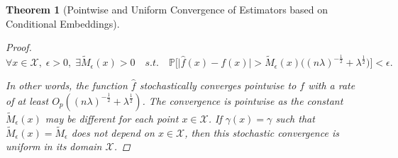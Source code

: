 \documentclass{article}
\newtheorem{theorem}{Theorem}[section]
\begin{document}
\begin{theorem}[Pointwise and Uniform Convergence of Estimators based on Conditional Embeddings]
\begin{proof}
			\begin{equation}
				\forall x \in \mathcal{X}, \; \epsilon > 0, \; \exists \tilde{M}_{\epsilon}(x) > 0 \quad s.t. \quad \mathbb{P}\Big[\big| \hat{f}(x) - f(x) \big| > \tilde{M}_{\epsilon}(x) \Big((n \lambda)^{-\frac{1}{2}} + \lambda^{\frac{1}{2}}\Big)\Big] < \epsilon.
			\end{equation}
	
			In other words, the function $\hat{f}$ stochastically converges pointwise to $f$ with a rate of at least $O_{p}((n \lambda)^{-\frac{1}{2}} + \lambda^{\frac{1}{2}})$. The convergence is pointwise as the constant $\tilde{M}_{\epsilon}(x)$ may be different for each point $x \in \mathcal{X}$. If $\gamma(x) = \gamma$ such that $\tilde{M}_{\epsilon}(x) = \tilde{M}_{\epsilon}$ does not depend on $x \in \mathcal{X}$, then this stochastic convergence is uniform in its domain $\mathcal{X}$.
		\end{proof}
		
	\end{theorem}
\end{document}
